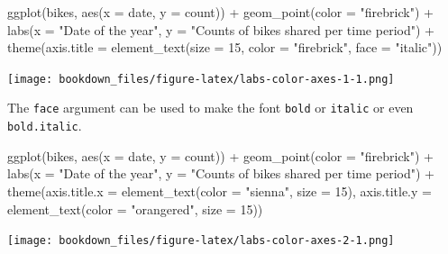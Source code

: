 \documentclass[
]{krantz}
\makeatletter
\newenvironment{Shaded}{\begin{snugshade}}{\end{snugshade}}
\newcommand{\AttributeTok}[1]{\textcolor[rgb]{0.61,0.61,0.61}{#1}}
\newcommand{\DecValTok}[1]{\textcolor[rgb]{0.06,0.06,0.06}{#1}}
\newcommand{\FunctionTok}[1]{\textcolor[rgb]{0,0,0}{#1}}
\newcommand{\NormalTok}[1]{#1}
\newcommand{\SpecialCharTok}[1]{\textcolor[rgb]{0,0,0}{#1}}
\newcommand{\StringTok}[1]{\textcolor[rgb]{0.5,0.5,0.5}{#1}}
\newenvironment{kframe}{%
\medskip{}
\setlength{\fboxsep}{.8em}
 \def\at@end@of@kframe{}%
 \ifinner\ifhmode%
  \def\at@end@of@kframe{\end{minipage}}%
  \begin{minipage}{\columnwidth}%
 \fi\fi%
 \def\FrameCommand##1{\hskip\@totalleftmargin \hskip-\fboxsep
 \colorbox{shadecolor}{##1}\hskip-\fboxsep
     \hskip-\linewidth \hskip-\@totalleftmargin \hskip\columnwidth}%
 \MakeFramed {\advance\hsize-\width
   \@totalleftmargin\z@ \linewidth\hsize
   \@setminipage}}%
 {\par\unskip\endMakeFramed%
 \at@end@of@kframe}
\renewenvironment{Shaded}{\begin{kframe}}{\end{kframe}}
\makeatother
\begin{document}
\begin{Shaded}
\begin{Highlighting}[]
\FunctionTok{ggplot}\NormalTok{(bikes, }\FunctionTok{aes}\NormalTok{(}\AttributeTok{x =}\NormalTok{ date, }\AttributeTok{y =}\NormalTok{ count)) }\SpecialCharTok{+}
  \FunctionTok{geom\_point}\NormalTok{(}\AttributeTok{color =} \StringTok{"firebrick"}\NormalTok{) }\SpecialCharTok{+}
  \FunctionTok{labs}\NormalTok{(}\AttributeTok{x =} \StringTok{"Date of the year"}\NormalTok{, }
       \AttributeTok{y =} \StringTok{"Counts of bikes shared per time period"}\NormalTok{) }\SpecialCharTok{+}
  \FunctionTok{theme}\NormalTok{(}\AttributeTok{axis.title =} \FunctionTok{element\_text}\NormalTok{(}\AttributeTok{size =} \DecValTok{15}\NormalTok{, }\AttributeTok{color =} \StringTok{"firebrick"}\NormalTok{,}
                                  \AttributeTok{face =} \StringTok{"italic"}\NormalTok{))}
\end{Highlighting}
\end{Shaded}

\texttt{[image: bookdown\_files/figure-latex/labs-color-axes-1-1.png]}

The \texttt{face} argument can be used to make the font \texttt{bold} or \texttt{italic} or even \texttt{bold.italic}.

\begin{Shaded}
\begin{Highlighting}[]
\FunctionTok{ggplot}\NormalTok{(bikes, }\FunctionTok{aes}\NormalTok{(}\AttributeTok{x =}\NormalTok{ date, }\AttributeTok{y =}\NormalTok{ count)) }\SpecialCharTok{+}
  \FunctionTok{geom\_point}\NormalTok{(}\AttributeTok{color =} \StringTok{"firebrick"}\NormalTok{) }\SpecialCharTok{+}
  \FunctionTok{labs}\NormalTok{(}\AttributeTok{x =} \StringTok{"Date of the year"}\NormalTok{, }
       \AttributeTok{y =} \StringTok{"Counts of bikes shared per time period"}\NormalTok{) }\SpecialCharTok{+}
  \FunctionTok{theme}\NormalTok{(}\AttributeTok{axis.title.x =} \FunctionTok{element\_text}\NormalTok{(}\AttributeTok{color =} \StringTok{"sienna"}\NormalTok{, }\AttributeTok{size =} \DecValTok{15}\NormalTok{),}
        \AttributeTok{axis.title.y =} \FunctionTok{element\_text}\NormalTok{(}\AttributeTok{color =} \StringTok{"orangered"}\NormalTok{, }\AttributeTok{size =} \DecValTok{15}\NormalTok{))}
\end{Highlighting}
\end{Shaded}

\texttt{[image: bookdown\_files/figure-latex/labs-color-axes-2-1.png]}
\end{document}
